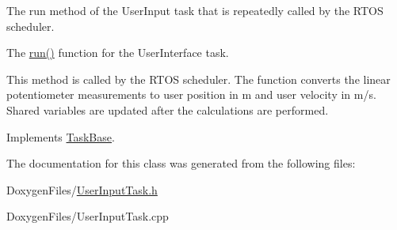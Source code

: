 The run method of the User\+Input task that is repeatedly called by the R\+T\+OS scheduler. 

The {\ttfamily \mbox{\hyperlink{class_user_input_task_a03666bddf33829bd1eb0dfcfd7f7075b}{run()}}} function for the User\+Interface task.

This method is called by the R\+T\+OS scheduler. The function converts the linear potentiometer measurements to user position in m and user velocity in m/s. Shared variables are updated after the calculations are performed. 

Implements \mbox{\hyperlink{class_task_base_adcf6036ad9c860051ccf392ba5e7dbbc}{Task\+Base}}.



The documentation for this class was generated from the following files\+:\begin{DoxyCompactItemize}
\item 
Doxygen\+Files/\mbox{\hyperlink{_user_input_task_8h}{User\+Input\+Task.\+h}}\item 
Doxygen\+Files/User\+Input\+Task.\+cpp\end{DoxyCompactItemize}
